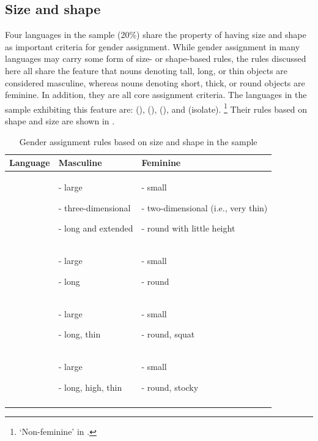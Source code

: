 \documentclass[output=collectionpaper]{langsci/langscibook}
\begin{document}
\subsection{Size and shape}
\label{sec:Svard:5.1}
Four languages in the sample (20\%) share the property of having size and shape as important criteria for gender assignment. While gender assignment in many languages may carry some form of size- or shape-based rules, the rules discussed here all share the feature that nouns denoting tall, long, or thin objects are considered masculine, whereas nouns denoting short, thick, or round objects are feminine. In addition, they are all core assignment criteria. The languages in the sample exhibiting this feature are:  (),  (),  (), and  (isolate).%
\footnote{%
`Non-feminine' in .
} %
Their rules based on shape and size are shown in .


\begin{table}
\begin{tabularx}{\textwidth}{lQQ}
\lsptoprule
 Language &  Masculine & Feminine\\\midrule
{} & {{}- large}

{{}- three-dimensional}

{}- long and extended & {{}- small}

{{}- two-dimensional (i.e., very thin)}

{}- round with little height\\
 & {{}- large}

{}- long & {{}- small}

{}- round\\
 & {{}- large}

{}- long, thin & {{}- small}

{}- round, squat\\
 & {{}- large}

{}- long, high, thin & {{}- small}

{}- round, stocky\\
\lspbottomrule
\end{tabularx}

\caption{Gender assignment rules based on size and shape in the sample}
\label{tab:Svard:13}
\end{table}
\end{document}
